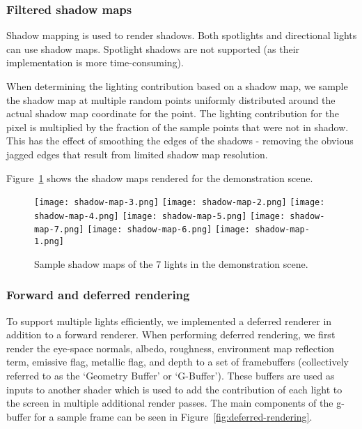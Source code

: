 \documentclass[11pt]{scrartcl} %
\begin{document}
        \subsubsection{Filtered shadow maps}

            Shadow mapping is used to render shadows. Both spotlights and
            directional lights can use shadow maps. Spotlight shadows are not
            supported (as their implementation is more time-consuming).

            When determining the lighting contribution based on a shadow map,
            we sample the shadow map at multiple random points uniformly
            distributed around the actual shadow map coordinate for the point.
            The lighting contribution for the pixel is multiplied by the
            fraction of the sample points that were not in shadow. This has the
            effect of smoothing the edges of the shadows - removing the obvious
            jagged edges that result from limited shadow map resolution.

            Figure~\ref{fig:shadow-maps} shows the shadow maps rendered for the demonstration scene.

            \begin{figure}%
                \centering
                \texttt{[image: shadow-map-3.png]}
                \texttt{[image: shadow-map-2.png]}
                \texttt{[image: shadow-map-4.png]}
                \texttt{[image: shadow-map-5.png]}
                \texttt{[image: shadow-map-7.png]}
                \texttt{[image: shadow-map-6.png]}
                \texttt{[image: shadow-map-1.png]}
                \caption[Deferred rendering buffers]{
                    Sample shadow maps of the 7 lights in the demonstration scene.
                }
                \label{fig:shadow-maps}
            \end{figure}

        \subsubsection{Forward and deferred rendering}

            To support multiple lights efficiently, we implemented a deferred
            renderer in addition to a forward renderer. When performing
            deferred rendering, we first render the eye-space normals, albedo,
            roughness, environment map reflection term, emissive flag, metallic
            flag, and depth to a set of framebuffers (collectively referred to
            as the `Geometry Buffer' or `G-Buffer'). These buffers are used as
            inputs to another shader which is used to add the contribution of
            each light to the screen in multiple additional render passes.
            The main components of the g-buffer for a sample frame can be seen in Figure~\ref{fig:deferred-rendering}.
\end{document}
